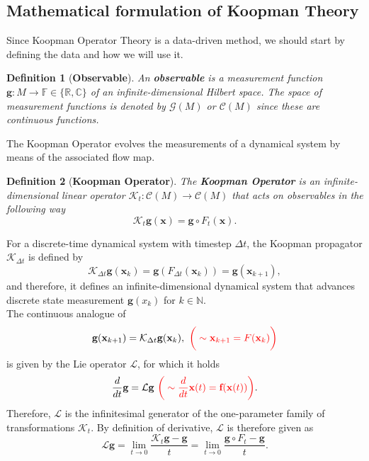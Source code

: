 \documentclass[]{article}
\newtheorem{definition}{Definition}
\begin{document}
\subsection{Mathematical formulation of Koopman Theory}
Since Koopman Operator Theory is a data-driven method, we should start by defining the data and how we will use it.
\begin{definition}[\textbf{Observable}]
An \textbf{observable} is a measurement function $\textbf{g}:M \to \mathbb{F} \in \{\mathbb{R}, \mathbb{C}\}$ of an infinite-dimensional Hilbert space. The space of measurement functions is denoted by $\mathcal{G}(M)$ or $\mathcal{C}(M)$ since these are continuous functions.
\end{definition}
The Koopman Operator evolves the measurements of a dynamical system by means of the associated flow map.
\begin{definition}[\textbf{Koopman Operator}]
The \textbf{Koopman Operator} is an infinite-dimensional linear operator $\mathcal{K}_t: \mathcal{C}(M) \to \mathcal{C}(M)$ that acts on observables in the following way
\begin{equation}
	\mathcal{K}_t \textbf{g}(\textbf{x}) = \textbf{g} \circ F_t (\textbf{x}).
\end{equation}
\end{definition}
For a discrete-time dynamical system with timestep $\Delta t$, the Koopman propagator $\mathcal{K}_{\Delta t}$ is defined by
\begin{equation}
	\mathcal{K}_{\Delta t} \textbf{g}(\textbf{x}_k) = \textbf{g}(F_{\Delta t}(\textbf{x}_k)) = \textbf{g}(\textbf{x}_{k+1}),
\end{equation}
and therefore, it defines an infinite-dimensional dynamical system that advances discrete state measurement $\textbf{g}(x_k)$ for $k \in \mathbb{N}$. \\
The continuous analogue of 
\begin{equation}
	\textbf{g}(\textbf{x}_{k+1}) = \mathcal{K}_{\Delta t} \textbf{g}(\textbf{x}_k), \,\, \text{$\color{red} \bigg(\sim \textbf{x}_{k+1} = F (\textbf{x}_k)\bigg)$}
\end{equation}
is given by the Lie operator $\mathcal{L}$, for which it holds
\begin{equation}
	\frac{d}{dt} \textbf{g} = \mathcal{L} \textbf{g} \,\, \text{$\color{red} \bigg(\sim \frac{d}{dt} \textbf{x}(t) = \textbf{f}(\textbf{x}(t))\bigg)$}.
\end{equation}
Therefore, $\mathcal{L}$ is the infinitesimal generator of the one-parameter family of transformations $\mathcal{K}_t$. By definition of derivative, $\mathcal{L}$ is therefore given as
\begin{equation}
	\mathcal{L}\textbf{g}=\lim_{t \to 0} \frac{\mathcal{K}_t\textbf{g}-\textbf{g}}{t}=\lim_{t \to 0} \frac{\textbf{g} \circ F_t-\textbf{g}}{t}.
\end{equation}
\end{document}
